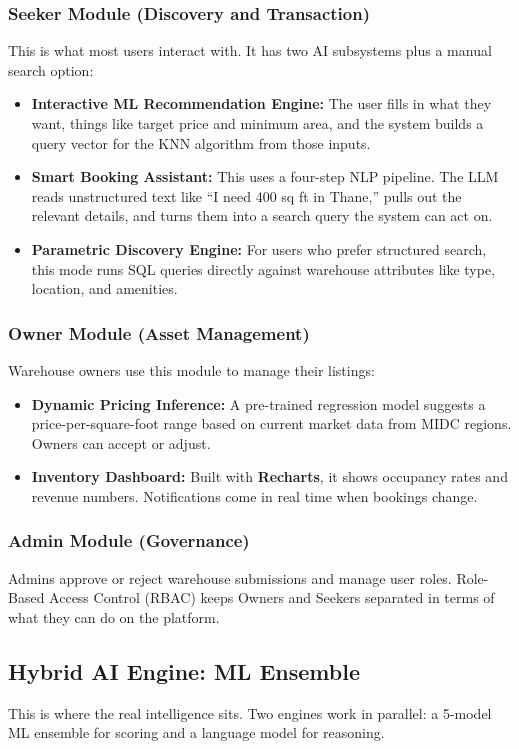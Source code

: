 \documentclass[conference]{IEEEtran}
\begin{document}
\subsubsection{Seeker Module (Discovery and Transaction)}
This is what most users interact with. It has two AI subsystems plus a manual search option:
\begin{itemize}
    \item \textbf{Interactive ML Recommendation Engine:} The user fills in what they want, things like target price and minimum area, and the system builds a query vector for the KNN algorithm from those inputs.
    \item \textbf{Smart Booking Assistant:} This uses a four-step NLP pipeline. The LLM reads unstructured text like ``I need 400 sq ft in Thane,'' pulls out the relevant details, and turns them into a search query the system can act on.
    \item \textbf{Parametric Discovery Engine:} For users who prefer structured search, this mode runs SQL queries directly against warehouse attributes like type, location, and amenities.
\end{itemize}

\subsubsection{Owner Module (Asset Management)}
Warehouse owners use this module to manage their listings:
\begin{itemize}
    \item \textbf{Dynamic Pricing Inference:} A pre-trained regression model suggests a price-per-square-foot range based on current market data from MIDC regions. Owners can accept or adjust.
    \item \textbf{Inventory Dashboard:} Built with \textbf{Recharts}, it shows occupancy rates and revenue numbers. Notifications come in real time when bookings change.
\end{itemize}

\subsubsection{Admin Module (Governance)}
Admins approve or reject warehouse submissions and manage user roles. Role-Based Access Control (RBAC) keeps Owners and Seekers separated in terms of what they can do on the platform.

\subsection{Hybrid AI Engine: ML Ensemble}
This is where the real intelligence sits. Two engines work in parallel: a 5-model ML ensemble for scoring and a language model for reasoning.
\end{document}
